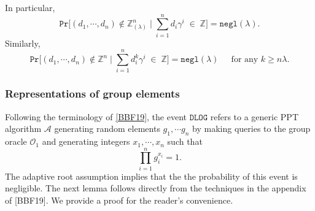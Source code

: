 \documentclass[11pt, lettersize, notitlepage, leqno, footskip=0.6cm]{article}
\newcommand{\bz}{\mathbb Z}
\newcommand{\pl}{\prod\limits}
\newcommand{\slim}{\sum\limits}
\newcommand{\ttt}{\texttt}
\newcommand{\negl}{\ttt{{negl}}}
\newcommand{\wti}{\widetilde}
\newcommand{\mc}{\mathcal}
\newcommand{\mb}{\mathbb}
\newcommand{\mbf}{\mathbf}
\newcommand{\lam}{\lambda}
\newcommand{\lamb}{\lambda}
\newcommand{\bzlam}{\bz_{(\lam)}}
\newcommand{\Prob}{\ttt{Pr}}
\newcommand{\vs}{\vspace{-0.15cm}}
\newcommand{\noin}{\noindent}
\newcommand{\op}{overwhelming probability}
\numberwithin{equation}{section}
\begin{document}
\begin{comment}
For the second part, note that \vs $$\Prob\big(\sum\limits_{i=1}^n d_i\gamma_j^i\in \bz\;\forall j\big|\; (d_1,\cdots,d_n)\notin \bz\big ) = \Prob\big(\sum\limits_{i=1}^n d_i\gamma^i\in \bz\big|\; (d_1,\cdots,d_n)\notin \bz\big )^{\lam} = \negl(\lam).$$\end{comment}

\noindent In particular, \vs $$\ttt{Pr}\big[(d_1,\cdots, d_n)\notin \bzlam^n \;\Big|\;\sum\limits_{i=1}^n d_i\gamma^i\; \in \;\bz \big] = \negl(\lamb).$$ Similarly, \vs $$ \ttt{Pr}\big[(d_1,\cdots, d_n)\notin \bz^n \;\Big|\;\sum\limits_{i=1}^n d_i^{k}\gamma^i\; \in \;\bz \big] = \negl(\lamb)\;\;\;\;\text{ for any } k\geq n\lam. $$



\begin{comment}In a setting where the Verifier is not satisfied with the elements $d_1,\cdots, d_n$ being $\bzlam$-integers and needs a probabilistic proof that they are, in fact, rational integers, the Prover could demonstrate that $\sum\limits_{i=1}^n d_i^{n\lam}\gamma^i\in \bz$. The resulting trade-off is a higher computational burden for the Prover. Computing \vs $$\wti{g} := g^{\slim_{i=1}^n d_i^{n\lam} \gamma^i}$$ entails \vs $$\mbf{O}\big(\log(\slim_{i=1}^n d_i^{n\lam} \gamma^i)\big) = \mbf{O}\big(n\lam\log(n)\max\{\log(d_i)\}\big) $$\vs squarings and products in $\mb{G}$. On the other hand, computing $g^{\slim_{i=1}^n d_i \gamma^i}$ entails \vs $$\mbf{O}\big(\log(\slim_{i=1}^n d_i\gamma^i)\big) = \mbf{O}\big(\log(n)\max\{\log(d_i)\}) \big)$$ \vs group squarings and products. Given a randomly generated element $g\in \mb{G}$, if the Prover outputs an element $\wti{g} ,$ the fractional root assumption implies that $\sum\limits_{i=1}^n d_i^{n\lam}\gamma^i\in \bz$ except with negligible probability. lemma \ref{integers} then implies that with \op, $(d_1,\cdots,d_n)\in \bz^n$.\end{comment}

\subsubsection{\fontsize{11}{11}\selectfont Representations of group elements  }

\noin Following the terminology of \hyperlink{BBF19}{[BBF19]}, the event $\ttt{DLOG}$ refers to a generic PPT algorithm $\mc{A}$ generating random elements $g_1,\cdots g_n$ by making queries to the group oracle $\mc{O}_1$ and generating integers $x_1,\cdots,x_n$ such that \vs $$\pl_{i=1}^n g_i^{x_i} = 1 .$$ The adaptive root assumption implies that the the probability of this event is negligible. The next lemma follows directly from the techniques in the appendix of [BBF19]. We provide a proof for the reader's convenience.
\end{document}
